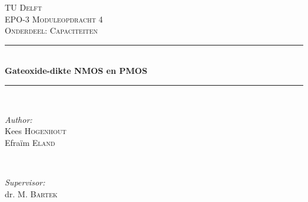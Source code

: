 \begin{titlepage}

\newcommand{\HRule}{\rule{\linewidth}{0.5mm}} %

\center %
 

\textsc{\LARGE TU Delft}\\[1.5cm] %
\textsc{\Large EPO-3 Moduleopdracht 4}\\[0.5cm] %
\textsc{\large Onderdeel: Capaciteiten}\\[0.5cm] %


\HRule \\[0.3 cm]
{ \huge \bfseries Gateoxide-dikte NMOS en PMOS}\\[0.2cm] %
\HRule \\[1.4cm]
 

\begin{minipage}{0.4\textwidth}
\begin{flushleft} \large
\emph{Author:}\\
Kees \textsc{Hogenhout} \\%
Efraïm \textsc{Eland} %
\end{flushleft}
\end{minipage}
~
\begin{minipage}{0.4\textwidth}
\begin{flushright} \large
\emph{Supervisor:} \\
dr. M. \textsc{Bartek}  %
\end{flushright}
\end{minipage}\\[4cm]



\end{titlepage}
